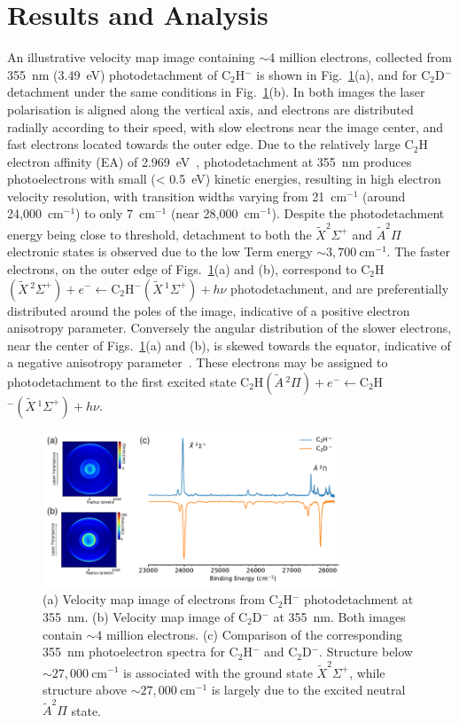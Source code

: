 \documentclass[aip,graphicx]{revtex4-1}
\begin{document}
\section{Results and Analysis}
An illustrative velocity map image containing $\sim$4 million electrons, collected from 355~nm (3.49~eV) photodetachment of C$_2$H$^-$ is shown in Fig.~\ref{fig:2}(a), and for C$_2$D$^-$ detachment under the same conditions in Fig.~\ref{fig:2}(b). In both images the laser polarisation is aligned along the vertical axis, and electrons are distributed radially according to their speed, with slow electrons near the image center, and fast electrons located towards the outer edge. Due to the relatively large C$_2$H electron affinity (EA) of 2.969~eV~\cite{erv91}, photodetachment at 355~nm produces photoelectrons with small (< 0.5~eV) kinetic energies, resulting in high electron velocity resolution, with transition widths varying from 21~cm$^{-1}$ (around 24,000~cm$^{-1}$) to only 7~cm$^{-1}$ (near 28,000~cm$^{-1}$). Despite the photodetachment energy being close to threshold, detachment to both the $\tilde{X} ^2\Sigma^+$ and $\tilde{A} ^2\Pi$ electronic states is observed due to the low Term energy $\sim 3,700~$cm$^{-1}$. The faster electrons, on the outer edge of Figs.~\ref{fig:2}(a) and (b), correspond to C$_2$H$(\tilde{X}\,^2\Sigma^+)+e^- \leftarrow $C$_2$H$^-(\tilde{X}\,^1\Sigma^+)+h\nu$ photodetachment, and are preferentially distributed around the poles of the image, indicative of a positive electron anisotropy parameter. Conversely the angular distribution of the slower electrons, near the center of Figs.~\ref{fig:2}(a) and (b), is skewed towards the equator, indicative of a negative anisotropy parameter~\cite{buc70}. These electrons may be assigned to photodetachment to the first excited state C$_2$H$(\tilde{A}\,^2\Pi)+e^- \leftarrow $C$_2$H$^-(\tilde{X}\,^1\Sigma^+)+h\nu$.

\begin{figure}
	\includegraphics[width=0.8\textwidth]{figures/Fig2}
	\caption{(a) Velocity map image of electrons from C$_2$H$^-$ photodetachment at 355~nm. (b) Velocity map image of C$_2$D$^-$ at 355~nm. Both images contain $\sim4$ million electrons. (c) Comparison of the corresponding 355~nm photoelectron spectra for C$_2$H$^-$ and C$_2$D$^-$. Structure below $\sim 27,000~$cm$^{-1}$ is associated with the ground state $\tilde{X} ^2\Sigma^+$, while structure above  $\sim 27,000~$cm$^{-1}$ is largely due to the excited neutral $\tilde{A} ^2\Pi$ state.}
	\label{fig:2}
\end{figure}
\end{document}
